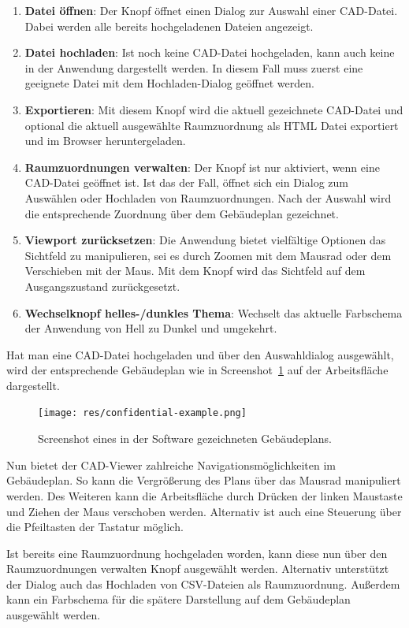 \begin{enumerate}
    \item \textbf{Datei öffnen}: Der Knopf öffnet einen Dialog zur Auswahl einer CAD-Datei.
    Dabei werden alle bereits hochgeladenen Dateien angezeigt.
    \item \textbf{Datei hochladen}: Ist noch keine CAD-Datei hochgeladen, kann auch keine in der Anwendung dargestellt werden.
    In diesem Fall muss zuerst eine geeignete Datei mit dem Hochladen-Dialog geöffnet werden.
    \item \textbf{Exportieren}: Mit diesem Knopf wird die aktuell gezeichnete CAD-Datei und optional die aktuell ausgewählte Raumzuordnung als HTML Datei exportiert und im Browser heruntergeladen.
    \item \textbf{Raumzuordnungen verwalten}: Der Knopf ist nur aktiviert, wenn eine CAD-Datei geöffnet ist.
    Ist das der Fall, öffnet sich ein Dialog zum Auswählen oder Hochladen von Raumzuordnungen.
    Nach der Auswahl wird die entsprechende Zuordnung über dem Gebäudeplan gezeichnet.
    \item \textbf{Viewport zurücksetzen}: Die Anwendung bietet vielfältige Optionen das Sichtfeld zu manipulieren, sei es durch Zoomen mit dem Mausrad oder dem Verschieben mit der Maus.
    Mit dem Knopf wird das Sichtfeld auf dem Ausgangszustand zurückgesetzt.
    \item \textbf{Wechselknopf helles-/dunkles Thema}: Wechselt das aktuelle Farbschema der Anwendung von Hell zu Dunkel und umgekehrt.
\end{enumerate}

Hat man eine CAD-Datei hochgeladen und über den Auswahldialog ausgewählt, wird der entsprechende Gebäudeplan wie in Screenshot~\ref{fig:app-screenshot-plan} auf der Arbeitsfläche dargestellt.

\begin{figure}
    \texttt{[image: res/confidential-example.png]}
    \caption{Screenshot eines in der Software gezeichneten Gebäudeplans.}
    \label{fig:app-screenshot-plan}
\end{figure}

Nun bietet der CAD-Viewer zahlreiche Navigationsmöglichkeiten im Gebäudeplan.
So kann die Vergrößerung des Plans über das Mausrad manipuliert werden.
Des Weiteren kann die Arbeitsfläche durch Drücken der linken Maustaste und Ziehen der Maus verschoben werden.
Alternativ ist auch eine Steuerung über die Pfeiltasten der Tastatur möglich.

Ist bereits eine Raumzuordnung hochgeladen worden, kann diese nun über den \glqq{}Raumzuordnungen verwalten\grqq{} Knopf ausgewählt werden.
Alternativ unterstützt der Dialog auch das Hochladen von CSV-Dateien als Raumzuordnung.
Außerdem kann ein Farbschema für die spätere Darstellung auf dem Gebäudeplan ausgewählt werden.

